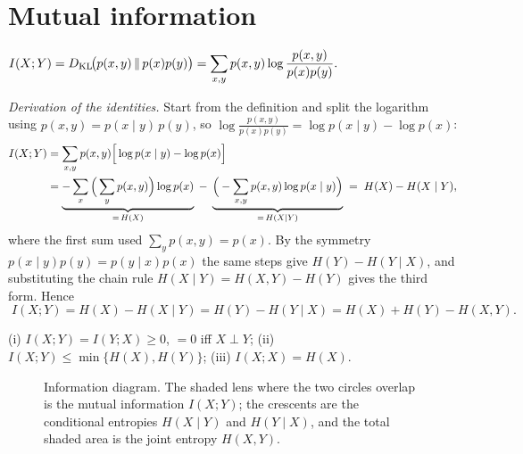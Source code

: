 \documentclass[11pt]{article}
\begin{document}
\section{Mutual information}\label{sec:mi}
\begin{definition}
$\displaystyle I(X;Y)=D_{\mathrm{KL}}\!\big(p(x,y)\,\|\,p(x)p(y)\big)=\sum_{x,y}p(x,y)\log\frac{p(x,y)}{p(x)p(y)}.$
\end{definition}
\emph{Derivation of the identities.} Start from the definition and split the logarithm using
$p(x,y)=p(x\mid y)\,p(y)$, so $\log\frac{p(x,y)}{p(x)p(y)}=\log p(x\mid y)-\log p(x)$:
\begin{align}
  I(X;Y)&=\sum_{x,y}p(x,y)\Big[\log p(x\mid y)-\log p(x)\Big]\notag\\
  &=\underbrace{-\sum_{x}\Big(\sum_y p(x,y)\Big)\log p(x)}_{=\,H(X)}
   \;-\;\underbrace{\Big(-\sum_{x,y}p(x,y)\log p(x\mid y)\Big)}_{=\,H(X\mid Y)}
   \;=\;H(X)-H(X\mid Y),
\end{align}
where the first sum used $\sum_y p(x,y)=p(x)$. By the symmetry $p(x\mid y)p(y)=p(y\mid x)p(x)$ the
same steps give $H(Y)-H(Y\mid X)$, and substituting the chain rule $H(X\mid Y)=H(X,Y)-H(Y)$ gives
the third form. Hence
\begin{equation}
  \boxed{\;I(X;Y)=H(X)-H(X\mid Y)=H(Y)-H(Y\mid X)=H(X)+H(Y)-H(X,Y).\;}
  \label{eq:mi}
\end{equation}
\begin{theorem}[Properties]\label{thm:I}
(i) $I(X;Y)=I(Y;X)\ge0$, $=0$ iff $X\perp Y$; (ii) $I(X;Y)\le\min\{H(X),H(Y)\}$;
(iii) $I(X;X)=H(X)$.
\end{theorem}

\begin{figure}[h]
\centering
{}
\caption{Information diagram. The shaded lens where the two circles overlap is the mutual
information $I(X;Y)$; the crescents are the conditional entropies $H(X\mid Y)$ and $H(Y\mid X)$, and
the total shaded area is the joint entropy $H(X,Y)$.}
\end{figure}
\end{document}
